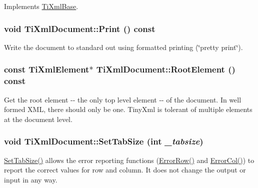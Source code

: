 Implements \hyperlink{class_ti_xml_base}{TiXmlBase}.\hypertarget{class_ti_xml_document_af08389ec70ee9b2de7f800e206a18510}{
\subsubsection[{Print}]{\setlength{\rightskip}{0pt plus 5cm}void TiXmlDocument::Print () const}}
\label{class_ti_xml_document_af08389ec70ee9b2de7f800e206a18510}
Write the document to standard out using formatted printing (\char`\"{}pretty print\char`\"{}). \hypertarget{class_ti_xml_document_ad09d17927f908f40efb406af2fb873be}{
\subsubsection[{RootElement}]{\setlength{\rightskip}{0pt plus 5cm}const {\bf TiXmlElement}$\ast$ TiXmlDocument::RootElement () const}}
\label{class_ti_xml_document_ad09d17927f908f40efb406af2fb873be}
Get the root element -\/-\/ the only top level element -\/-\/ of the document. In well formed XML, there should only be one. TinyXml is tolerant of multiple elements at the document level. \hypertarget{class_ti_xml_document_a51dac56316f89b35bdb7d0d433ba988e}{
\subsubsection[{SetTabSize}]{\setlength{\rightskip}{0pt plus 5cm}void TiXmlDocument::SetTabSize (int {\em \_\-tabsize})}}
\label{class_ti_xml_document_a51dac56316f89b35bdb7d0d433ba988e}
\hyperlink{class_ti_xml_document_a51dac56316f89b35bdb7d0d433ba988e}{SetTabSize()} allows the error reporting functions (\hyperlink{class_ti_xml_document_af30efc75e804aa2e92fb8be3a8cb676e}{ErrorRow()} and \hyperlink{class_ti_xml_document_aa90bc630ee5203c6109ca5fad3323649}{ErrorCol()}) to report the correct values for row and column. It does not change the output or input in any way.

